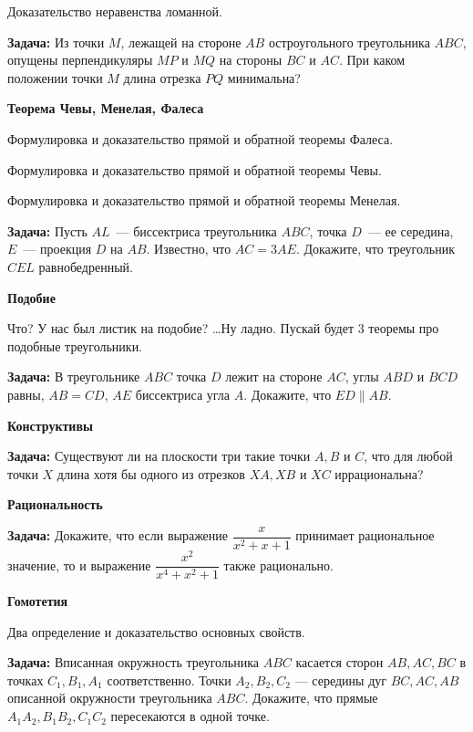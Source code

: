 \documentclass{article}
\begin{document}
\begin{enumerate_boxed}
        Доказательство неравенства ломанной.

        \textbf{Задача:} Из точки $M$, лежащей на стороне $AB$ остроугольного треугольника $ABC$, опущены перпендикуляры $MP$ и $MQ$ на стороны $BC$ и $AC$.
        При каком положении точки $M$ длина отрезка $PQ$ минимальна?

        \item \textbf{Теорема Чевы, Менелая, Фалеса}

        Формулировка и доказательство прямой и обратной теоремы Фалеса.

        Формулировка и доказательство прямой и обратной теоремы Чевы.

        Формулировка и доказательство прямой и обратной теоремы Менелая.

        \textbf{Задача:} Пусть $AL$~--- биссектриса треугольника $ABC$, точка $D$~--- ее середина, $E$~--- проекция $D$ на $AB$.
        Известно, что $AC = 3AE$.
        Докажите, что треугольник $CEL$ равнобедренный.

        \item \textbf{Подобие}

        Что?
        У нас был листик на подобие? \ldots Ну ладно.
        Пускай будет 3 теоремы про подобные треугольники.

        \textbf{Задача:} В треугольнике $ABC$ точка $D$ лежит на стороне $AC$, углы $ABD$ и $BCD$ равны, $AB = CD$, $AE$ биссектриса угла $A$.
        Докажите, что $ED \parallel AB$.

        \item \textbf{Конструктивы}

        \textbf{Задача:} Существуют ли на плоскости три такие точки $A, B$ и $C$, что для любой точки $X$ длина хотя бы одного из отрезков $XA, XB$ и $XC$ иррациональна?

        \item \textbf{Рациональность}

        \textbf{Задача:} Докажите, что если выражение  $\dfrac{x}{x^2 + x + 1}$ принимает рациональное значение, то и выражение  $\dfrac{x^2}{x^4 + x^2 + 1}$ также рационально.

        \item \textbf{Гомотетия}

        Два определение и доказательство основных свойств.

        \textbf{Задача:} Вписанная окружность треугольника $ABC$ касается сторон $AB, AC, BC$ в точках $C_1, B_1, A_1$ соответственно.
        Точки $A_2, B_2, C_2$ — середины дуг $BC, AC, AB$ описанной окружности треугольника $ABC$.
        Докажите, что прямые $A_{1}A_2, B_{1}B_2, C_{1}C_2$ пересекаются в одной точке.


\end{enumerate_boxed}
\end{document}
